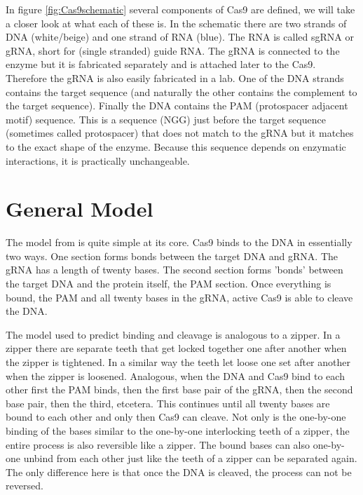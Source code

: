 In figure \ref{fig:Cas9schematic} several components of Cas9 are defined, we will take a closer look at what each of these is. In the schematic there are two strands of DNA (white/beige) and one strand of RNA (blue). The RNA is called sgRNA or gRNA, short for (single stranded) guide RNA. The gRNA is connected to the enzyme but it is fabricated separately and is attached later to the Cas9. Therefore the gRNA is also easily fabricated in a lab. One of the DNA strands contains the target sequence (and naturally the other contains the complement to the target sequence). Finally the DNA contains the PAM (protospacer adjacent motif) sequence. This is a sequence (NGG) just before the target sequence (sometimes called protospacer) that does not match to the gRNA but it matches to the exact shape of the enzyme. Because this sequence depends on enzymatic interactions, it is practically unchangeable.

\section{General Model}
\label{seq:generalmodel}

The model from \cite{Misha} is quite simple at its core. Cas9 binds to the DNA in essentially two ways. One section forms bonds between the target DNA and gRNA. The gRNA has a length of twenty bases. The second section forms 'bonds' between the target DNA and the protein itself, the PAM section. Once everything is bound, the PAM and all twenty bases in the gRNA, active Cas9 is able to cleave the DNA.


The model used to predict binding and cleavage is analogous to a zipper. In a zipper there are separate teeth that get locked together one after another when the zipper is tightened. In a similar way the teeth let loose one set after another when the zipper is loosened. Analogous, when the DNA and Cas9 bind to each other first the PAM binds, then the first base pair of the gRNA, then the second base pair, then the third, etcetera. This continues until all twenty bases are bound to each other and only then Cas9 can cleave. Not only is the one-by-one binding of the bases similar to the one-by-one interlocking teeth of a zipper, the entire process is also reversible like a zipper. The bound bases can also one-by-one unbind from each other just like the teeth of a zipper can be separated again. The only difference here is that once the DNA is cleaved, the process can not be reversed.

